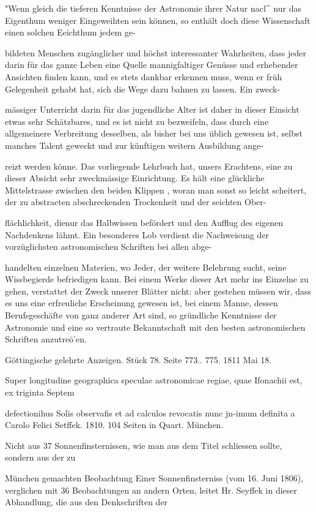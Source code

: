 \documentclass[10pt,a4paper]{article}
\begin{document}
"Wenn gleich die tieferen Kenntnisse der Astronomie ihrer Natur nacl\textasciicircum{} nur das Eigenthum weniger Eingeweihten sein können, so enthält doch diese Wissenschaft einen solchen Eeichthum jedem ge-

bildeten Menschen zugänglicher und höchst interessanter Wahrheiten, dass jeder darin für das ganze Leben eine Quelle mannigfaltiger Genüsse und erhebender Ansichten finden kann, und es stets dankbar erkennen muss, wenn er früh Gelegenheit gehabt hat, sich die Wege dazu bahnen zu lassen. Ein zweck-

mässiger Unterricht darin für das jugendliche Alter ist daher in dieser Einsicht etwas sehr Schätzbares, und es ist nicht zu bezweifeln, dass durch eine allgemeinere Verbreitung desselben, als bisher bei uns üblich gewesen ist, selbst manches Talent geweckt und zur künftigen weitern Ausbildung ange-

reizt werden könne. Das vorliegende Lehrbuch hat, unsers Erachtens, eine zu dieser Absicht sehr zweckmässige Einrichtung. Es hält eine glückliche Mittelstrasse zwischen den beiden Klippen , woran man sonst so leicht scheitert, der zu abstracten abschreckenden Trockenheit und der seichten Ober-

flächlichkeit, dienur das Halbwissen befördert und den Aufflug des eigenen Nachdenkens lähmt. Ein besonderes Lob verdient die Nachweisung der vorzüglichsten astronomischen Schriften bei allen abge-

handelten einzelnen Materien, wo Jeder, der weitere Belehrung sucht, seine Wissbegierde befriedigen kann. Bei einem Werke dieser Art mehr ins Einzelne zu gehen, verstattet der Zweck unserer Blätter nicht: aber gestehen müssen wir, dass es uns eine erfreuliche Erscheinung gewesen ist, bei einem Manne, dessen Berufsgeschäfte von ganz anderer Art sind, so gründliche Kenntnisse der Astronomie und eine so vertraute Bekanntschaft mit den besten astronomischen Schriften anzutreö'en.

Göttingische gelehrte Anzeigen. Stück 78. Seite 773.. 775. 1811 Mai 18.

Super longitudine geographica speculae astronomicae regiae, quae Ifonachii est, ex triginta Septem

defectionihus Solis observafis et ad calculos revocatis nunc jn-imum definita a Carolo Felici Setffek. 1810. 104 Seiten in Quart. München.

Nicht aus 37 Sonnenfinsternissen, wie man aus dem Titel schliessen sollte, sondern aus der zu

München gemachten Beobachtung Einer Sonnenfinsterniss (vom 16. Juni 1806), verglichen mit 36 Beobachtungen an andern Orten, leitet Hr. Seyffek in dieser Abhandlung, die aus den Denkschriften der
\end{document}
